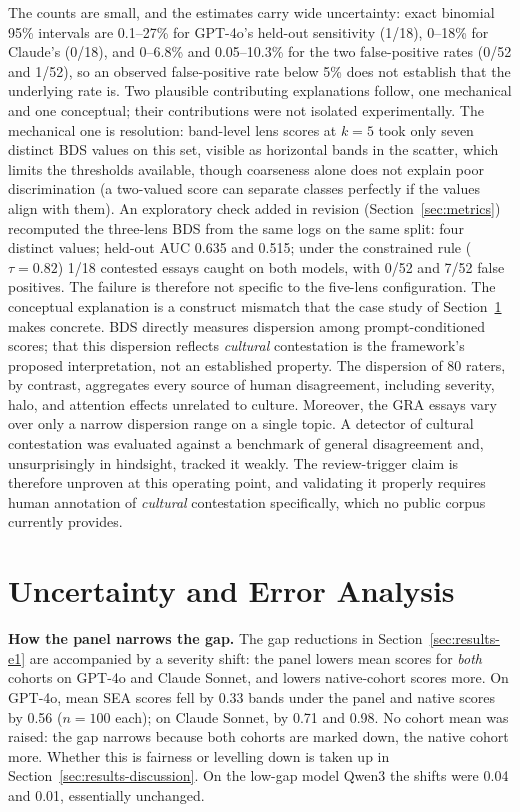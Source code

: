 The counts are small, and the estimates carry wide uncertainty:
exact binomial 95\% intervals are 0.1--27\% for GPT-4o's held-out
sensitivity (1/18), 0--18\% for Claude's (0/18), and 0--6.8\% and
0.05--10.3\% for the two false-positive rates (0/52 and 1/52), so
an observed false-positive rate below 5\% does not establish that
the underlying rate is. Two plausible contributing explanations
follow, one mechanical and one conceptual; their contributions were
not isolated experimentally. The mechanical one is resolution:
band-level lens scores at $k = 5$ took only seven distinct BDS
values on this set, visible as horizontal bands in the scatter,
which limits the thresholds available, though coarseness alone does
not explain poor discrimination (a two-valued score can separate
classes perfectly if the values align with them). An exploratory check added in revision
(Section~\ref{sec:metrics}) recomputed the three-lens BDS from the
same logs on the same split: four distinct values; held-out AUC
0.635 and 0.515; under the constrained rule ($\tau = 0.82$) 1/18
contested essays caught on both models, with 0/52 and 7/52 false
positives. The failure is therefore not specific to the five-lens
configuration. The conceptual explanation is a
construct mismatch that the case study of
Section~\ref{sec:results-uncertainty} makes concrete. BDS directly
measures dispersion among prompt-conditioned scores; that this
dispersion reflects \emph{cultural} contestation is the framework's
proposed interpretation, not an established property. The dispersion
of 80 raters, by contrast, aggregates
every source of human disagreement, including severity, halo, and
attention effects unrelated to culture. Moreover, the GRA essays vary over
only a narrow dispersion range on a single topic. A detector of
cultural contestation was evaluated against a benchmark of general
disagreement and, unsurprisingly in hindsight, tracked it weakly.
The review-trigger claim is therefore unproven at this operating
point, and validating it properly requires human annotation of
\emph{cultural} contestation specifically, which no public corpus
currently provides.

\section{Uncertainty and Error Analysis}
\label{sec:results-uncertainty}

\textbf{How the panel narrows the gap.} The gap reductions in
Section~\ref{sec:results-e1} are accompanied by a severity shift:
the panel lowers mean scores for \emph{both} cohorts on GPT-4o and
Claude Sonnet, and lowers native-cohort scores more. On GPT-4o, mean SEA
scores fell by 0.33 bands under the panel and native scores by 0.56
($n = 100$ each); on Claude Sonnet, by 0.71 and 0.98. No cohort
mean was raised: the gap narrows because both cohorts are marked
down, the native cohort more. Whether this is fairness or levelling
down is taken up in Section~\ref{sec:results-discussion}. On the
low-gap model Qwen3 the shifts were 0.04 and 0.01, essentially
unchanged.

